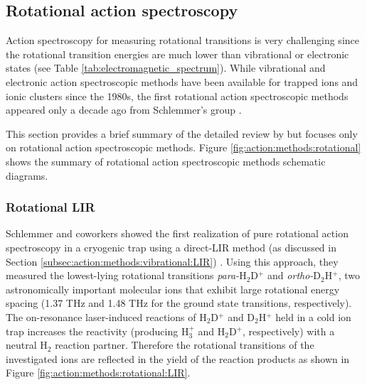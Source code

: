 \subsection{Rotational action spectroscopy}
\label{subsec:action:methods:rotational}

Action spectroscopy for measuring rotational transitions is very challenging
since the rotational transition energies are much lower than vibrational or
electronic states (see Table \ref{tab:electromagnetic_spectrum}). While
vibrational and electronic action spectroscopic methods have been available for
trapped ions and ionic clusters since the 1980s, the first rotational action
spectroscopic methods appeared only a decade ago from Schlemmer's group
\cite{brunken_laboratory_2014}.

This section provides a brief summary of the detailed review by
\citet{Asvany2021} but focuses only on rotational action spectroscopic methods.
Figure \ref{fig:action:methods:rotational} shows the summary of rotational
action spectroscopic methods schematic diagrams.


\subsubsection{Rotational LIR}
\label{subsec:rotational-LIR}

Schlemmer and coworkers showed the first realization of pure rotational action
spectroscopy in a cryogenic trap using a direct-LIR method (as discussed in
Section \ref{subsec:action:methods:vibrational:LIR}) \cite{Asvany2008}. Using
this approach, they measured the lowest-lying rotational transitions
\emph{para-}H$_2$D$^+$ and \emph{ortho-}D$_2$H$^+$, two astronomically
important molecular ions that exhibit large rotational energy spacing (1.37 THz
and 1.48 THz for the ground state transitions, respectively). The on-resonance
laser-induced reactions of H$_2$D$^+$ and D$_2$H$^+$ held in a cold ion trap
increases the reactivity (producing H$_3^+$ and H$_2$D$^+$, respectively) with
a neutral H$_2$ reaction partner. Therefore the rotational transitions of the
investigated ions are reflected in the yield of the reaction products as shown
in Figure \ref{fig:action:methods:rotational:LIR}.

